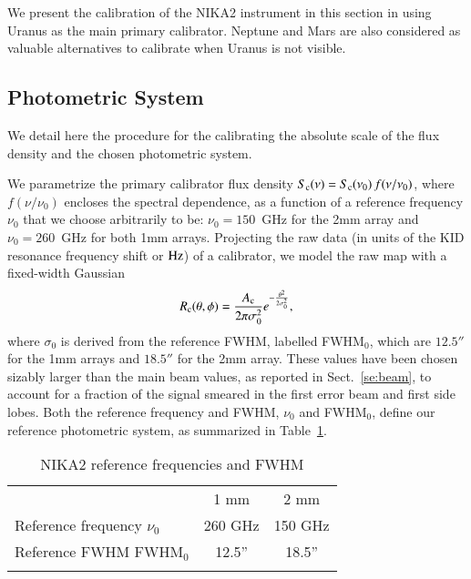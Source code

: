 
We present the calibration of the NIKA2 instrument in this section in using Uranus as the
main primary calibrator. Neptune and Mars are also considered as
valuable alternatives to calibrate when Uranus is not visible.


\subsection{Photometric System}

We detail here the procedure for the calibrating the absolute scale of
the flux density and the chosen photometric system.

We parametrize the primary calibrator flux density
$S_{\rm{c}}(\nu) = S_{\rm{c}}(\nu_0)\, f(\nu/\nu_{0})$, where $f(\nu/\nu_{0})$
encloses the spectral dependence, 
as a function of a reference frequency $\nu_{0}$ that we choose
arbitrarily to be: $\nu_{0} = 150$~GHz for the 2mm array and
$\nu_{0}= 260$~GHz for both 1mm arrays. Projecting the raw data (in
units of the KID resonance frequency shift or $\rm Hz$) of a
calibrator, we model the raw map with a fixed-width Gaussian
\begin{equation}
  R_{\rm{c}}(\theta, \phi)  = \frac{A_{\rm{c}}}{2 \pi \sigma_{0}^{2}}
e^{-\frac{\theta^{2}}{2\sigma_{0}^{2}}},
\end{equation}
where $\sigma_{0}$ is derived from the
reference FWHM, labelled FWHM$_{0}$, which are $12.5''$ for the 1mm
arrays and $18.5''$ for the 2mm array. These values have
been chosen sizably larger than the main beam values, as reported in
Sect.~\ref{se:beam}, to account for a fraction of the signal smeared 
in the first error beam and first side lobes.
Both the reference frequency and FWHM, $\nu_0$ and FWHM$_{0}$, define our reference photometric system, as
summarized in Table~\ref{tab:definitions}.

\begin{table}[!htbp]
  \begin{center}
    \caption{NIKA2 reference frequencies and FWHM}
    \begin{tabular}{lcc}
      \hline\hline
      \noalign{\smallskip}
      & 1 mm & 2 mm \\
      \noalign{\smallskip}
      \hline
      \noalign{\smallskip}
      Reference frequency $\nu_{0}$ & 260 GHz & 150 GHz \\
      Reference FWHM  FWHM$_{0}$    & 12.5'' & 18.5'' \\
      \noalign{\smallskip}
      \hline
    \end{tabular}
  \end{center}
  \label{tab:definitions}
\end{table}

